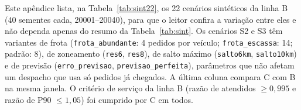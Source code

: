 
Este apêndice lista, na Tabela~\ref{tab:sint22}, os 22 cenários sintéticos da linha B (40 sementes cada, 20001--20040), para que o leitor confira a variação entre eles e não dependa apenas do resumo da Tabela~\ref{tab:sint}. Os cenários S2 e S3 têm variantes de frota (\texttt{frota\_abundante}: 4 pedidos por veículo; \texttt{frota\_escassa}: 14; padrão: 8), de zoneamento (\texttt{res6}, \texttt{res8}), de salto máximo (\texttt{salto6km}, \texttt{salto10km}) e de previsão (\texttt{erro\_previsao}, \texttt{previsao\_perfeita}), parâmetros que não afetam um despacho que usa só pedidos já chegados. A última coluna compara C com B na mesma janela. O critério de serviço da linha B (razão de atendidos $\ge 0{,}995$ e razão de P90 $\le 1{,}05$) foi cumprido por C em todos.

